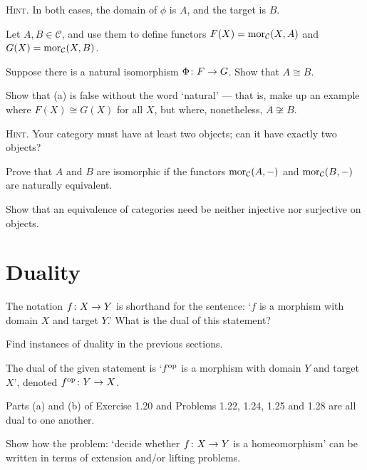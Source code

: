{\scshape Hint}. In both cases, the domain of $\phi$ is $A$, and the target is $B$.
\ep

\bs
\ben[label=(\alph*)]
\item
\item
\een
\es

\bp
Let $A,B \in \mathcal{C}$, and use them to define functors $F(X) = \operatorname{mor}_{\mathcal{C}}(X,A)$ and $G(X) = \operatorname{mor}_{\mathcal{C}}(X,B)$.
\ben[label=(\alph*)]
\item Suppose there is a natural isomorphism $\Phi \colon F \to G$. Show that $A\cong B$.
\item Show that (a) is false without the word `natural' --- that is, make up an example where $F(X)\cong G(X)$ for all $X$, but where, nonetheless, $A\not\cong B$.

{\scshape Hint}. Your category must have at least two objects; can it have exactly two objects?
\item Prove that $A$ and $B$ are isomorphic if the functors $\operatorname{mor}_{\mathcal{C}}(A,-)$ and $\operatorname{mor}_{\mathcal{C}}(B,-)$ are naturally equivalent.
\een
\ep

\bs
\ben[label=(\alph*)]
\item
\item
\item
\een
\es

\bx
Show that an equivalence of categories need be neither injective nor surjective on objects.
\ex

\bs
\es

\section{Duality}

\bx
\ben[label=(\alph*)]
\item The notation $f \colon X \to Y$ is shorthand for the sentence: `$f$ is a morphism with domain $X$ and target $Y$.' What is the dual of this statement?
\item Find instances of duality in the previous sections.
\een
\ex

\bs
\ben[label=(\alph*)]
\item The dual of the given statement is `$f^{\mathrm{op}}$ is a morphism with domain $Y$ and target $X$', denoted $f^{\mathrm{op}}\colon Y\to X$.
\item Parts (a) and (b) of Exercise 1.20 and Problems 1.22, 1.24, 1.25 and 1.28 are all dual to one another.
\een
\es

\begin{extrae}
\label{extr:liftext}
Show how the problem: `decide whether $f \colon X \to Y$ is a homeomorphism' can be written in terms of extension and/or lifting problems.
\end{extrae}


